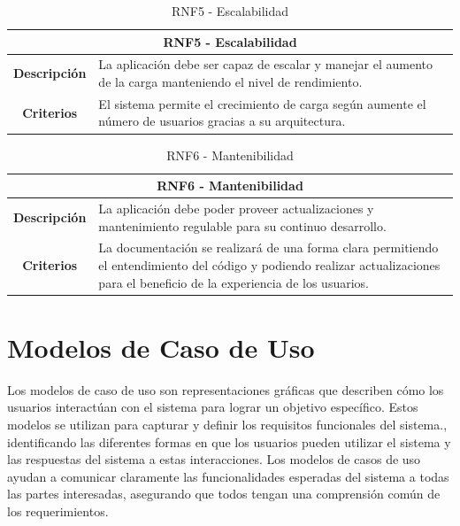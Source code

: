 \begin{table}[H]
    \centering
    \begin{tabular}{|c|p{10cm}|}
        \hline
        \multicolumn{2}{|c|}{\textbf{RNF5 - Escalabilidad}}                                                                                  \\
        \hline
        \textbf{Descripción} & La aplicación debe ser capaz de escalar y manejar el aumento de la carga manteniendo el nivel de rendimiento. \\
        \hline
        \textbf{Criterios}   & El sistema permite el crecimiento de carga según aumente el número de usuarios gracias a su arquitectura.     \\
        \hline
    \end{tabular}
    \caption{RNF5 - Escalabilidad}
\end{table}

\begin{table}[H]
    \centering
    \begin{tabular}{|c|p{10cm}|}
        \hline
        \multicolumn{2}{|c|}{\textbf{RNF6 - Mantenibilidad}}                                                                                                                                                     \\
        \hline
        \textbf{Descripción} & La aplicación debe poder proveer actualizaciones y mantenimiento regulable para su continuo desarrollo.                                                                           \\
        \hline
        \textbf{Criterios}   & La documentación se realizará de una forma clara permitiendo el entendimiento del código y podiendo realizar actualizaciones para el beneficio de la experiencia de los usuarios. \\
        \hline
    \end{tabular}
    \caption{RNF6 - Mantenibilidad}
\end{table}

\section{Modelos de Caso de Uso}

Los modelos de caso de uso son representaciones gráficas que describen cómo los usuarios interactúan con el sistema para lograr un objetivo específico. Estos modelos se utilizan para capturar y definir los requisitos funcionales del sistema., identificando las diferentes formas en que los usuarios pueden utilizar el sistema y las respuestas del sistema a estas interacciones. Los modelos de casos de uso ayudan a comunicar claramente las funcionalidades esperadas del sistema a todas las partes interesadas, asegurando que todos tengan una comprensión común de los requerimientos. \cite{ibm}

